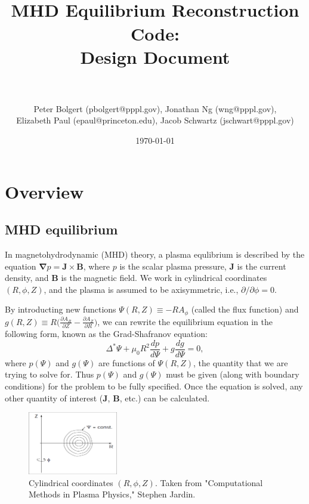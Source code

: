\documentclass[paper=a4, fontsize=11pt]{scrartcl} %
\title{	
\normalfont \normalsize 
\horrule{0.5pt} \\[0.4cm] %
\huge  MHD Equilibrium Reconstruction Code: \\ Design Document\\ %
\horrule{2pt} \\[0.5cm] %
}
\author{Peter Bolgert (pbolgert@pppl.gov), Jonathan Ng (wng@pppl.gov), \\ Elizabeth Paul (epaul@princeton.edu), Jacob Schwartz (jschwart@pppl.gov)} %
\date{\normalsize\today} %
\begin{document}
\maketitle %


\section{Overview}

\subsection{MHD equilibrium}

In magnetohydrodynamic (MHD) theory, a plasma equlibrium is described by the equation $\mathbf{\nabla} p = \mathbf{J} \times \mathbf{B}$, where $p$ is the scalar plasma pressure, $\mathbf{J}$ is the current density, and $\mathbf{B}$ is the magnetic field.  We work in cylindrical coordinates $(R, \phi, Z)$, and the plasma is assumed to be axisymmetric, i.e., $\partial / \partial \phi = 0$.

By introducting new functions $\Psi(R,Z) \equiv -R A_{\phi}$ (called the flux function) and $g(R,Z) \equiv R \big(\frac{\partial A_R}{\partial Z} - \frac{\partial A_Z}{\partial R}\big)$, we can rewrite the equilibrium equation in the following form, known as the Grad-Shafranov equation:
\begin{equation}
\Delta^{*} \Psi + \mu_0 R^2 \frac{dp}{d\Psi} + g \frac{dg}{d\Psi} = 0,
\end{equation}
where $p(\Psi)$ and $g(\Psi)$ are functions of $\Psi(R,Z)$, the quantity that we are trying to solve for.  Thus $p(\Psi)$ and $g(\Psi)$ must be given (along with boundary conditions) for the problem to be fully specified.  Once the equation is solved, any other quantity of interest ($\mathbf{J}$, $\mathbf{B}$, etc.) can be calculated.  

\begin{figure}
\centering
\captionsetup{justification=centering,margin=3cm}
\caption[caption]{Cylindrical coordinates $(R,\phi,Z)$.  Taken from "Computational Methods in Plasma Physics," Stephen Jardin.}

\includegraphics[width=0.35\textwidth]{coordinates}

\end{figure}
\end{document}
